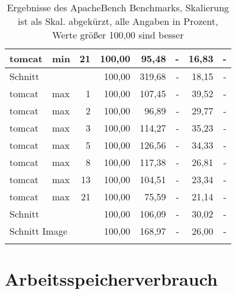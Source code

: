 \begin{footnotesize}
\begin{longtable}{llrrrrrr}
		tomcat         & min     & 21         & 100,00 & 95,48                       & -                              & 16,83  & -      \\ \hline
		Schnitt        &         &            & 100,00 & 319,68                      & -                              & 18,15  & -      \\ \hline
		tomcat         & max     & 1          & 100,00 & 107,45                      & -                              & 39,52  & -      \\
		tomcat         & max     & 2          & 100,00 & 96,89                       & -                              & 29,77  & -      \\
		tomcat         & max     & 3          & 100,00 & 114,27                      & -                              & 35,23  & -      \\
		tomcat         & max     & 5          & 100,00 & 126,56                      & -                              & 34,33  & -      \\
		tomcat         & max     & 8          & 100,00 & 117,38                      & -                              & 26,81  & -      \\
		tomcat         & max     & 13         & 100,00 & 104,51                      & -                              & 23,34  & -      \\
		tomcat         & max     & 21         & 100,00 & 75,59                       & -                              & 21,14  & -      \\ \hline
		Schnitt        &         &            & 100,00 & 106,09                      & -                              & 30,02  & -      \\ \hline
		\multicolumn{2}{l}{Schnitt Image} &            & 100,00 & 168,97                      & -                              & 26,00  & -      \\ \hline
\caption[Ergebnisse ApacheBench]{Ergebnisse des ApacheBench Benchmarks, \newline \footnotesize Skalierung ist als Skal. abgekürzt, alle Angaben in Prozent,  Werte größer 100,00 sind besser}
\label{tbl:abdetailauswertung}
\end{longtable}
\end{footnotesize}
\newpage

\section{Arbeitsspeicherverbrauch}


